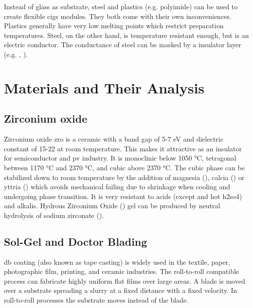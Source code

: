 %
Instead of glass as substrate, steel and plastics (e.g. polyimide\cite{feurer2017cigs}) can be used to create flexible \gls{cigs} modules. 
They both come with their own inconveniences. 
Plastics generally have very low melting points which restrict preparation temperatures.
Steel, on the other hand, is temperature resistant enough, but is an electric conductor. 
The conductance of steel can be masked by a insulator layer (e.g. , ).

\section{Materials and Their Analysis}
\subsection{Zirconium oxide}
Zirconium oxide \gls{zro} is a ceramic with a band gap of 5-7 eV and dielectric constant of 15-22 at room temperature\cite{Anwar2017}. 
This makes it attractive as an insulator for semiconductor and \gls{pv} industry. 
It is monoclinic below 1050 °C, tetragonal between 1170 °C and 2370 °C, and cubic above 2370 °C\cite{Nielsen2005}.
The cubic phase can be stabilized down to room temperature by the addition of magnesia (), calcia () or yttria () which avoids mechanical failing due to shrinkage 
when cooling and undergoing phase transition\cite{Nielsen2005}.
It is very resistant to acids (except  and hot \gls{h2so4}) and alkalis\cite{Nielsen2005}.
Hydrous Zirconium Oxide () gel can be produced by neutral hydrolysis of sodium zirconate ()\cite{Nielsen2005}.

\subsection{Sol-Gel and Doctor Blading}
%
\Gls{db} coating (also known as tape casting) is widely used in the textile, paper, photographic film, printing, and ceramic industries.
The roll-to-roll compatible process can fabricate highly uniform flat films over large areas\cite{yang2010large}.
A blade is moved over a substrate spreading a slurry at a fixed distance with a fixed velocity.
In roll-to-roll processes the substrate moves instead of the blade. 

